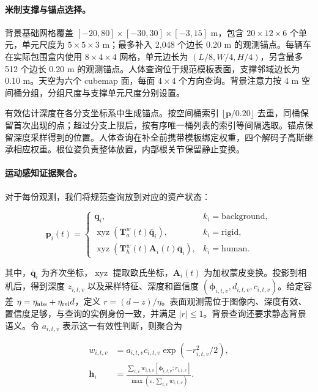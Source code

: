 \paragraph{米制支撑与锚点选择。}
背景基础网格覆盖 $[-20,80]\times[-30,30]\times[-3,15]$ m，包含 $20\times12\times6$ 个单元，单元尺度为 $5\times5\times3$ m；最多补入 2,048 个边长 0.20 m 的观测锚点。每辆车在实际包围盒内使用 $8\times4\times4$ 网格，单元边长为 $(L/8,W/4,H/4)$，另含最多 512 个边长 0.20 m 的观测锚点。人体查询位于规范模板表面，支撑邻域边长为 0.10 m。天空为六个 cubemap 面，每面 $4\times4$ 个方向查询。背景注意力按 4 m 空间桶分组，分组尺度与支撑单元尺度分别设置。

有效估计深度在各分支坐标系中生成锚点。按空间桶索引 $\lfloor\mathbf p/0.20\rfloor$ 去重，同桶保留首次出现的点；超过分支上限后，按有序唯一桶列表的索引等间隔选取。锚点保留深度采样得到的位置。人体查询在补全前携带模板绑定权重，四个解码子高斯继承相应权重。根位姿负责整体放置，内部根关节保留静止变换。

\paragraph{运动感知证据聚合。}

对于每份观测，我们将规范查询放到对应的资产状态：

\begin{equation}
\mathbf p_i(t)=
\begin{cases}
\mathbf q_i,& k_i=\mathrm{background},\\
\operatorname{xyz}(\mathbf T^w_a(t)\bar{\mathbf q}_i),& k_i=\mathrm{rigid},\\
\operatorname{xyz}(\mathbf T^w_h(t)\mathbf A_i(t)\bar{\mathbf q}_i),& k_i=\mathrm{human}.
\end{cases}
\label{eq:query-placement}
\end{equation}

其中，$\bar{\mathbf q}_i$ 为齐次坐标，$\operatorname{xyz}$ 提取欧氏坐标，$\mathbf A_i(t)$ 为加权蒙皮变换。投影到相机后，得到深度 $z_{i,t,v}$ 以及采样特征、深度和置信度 $(\boldsymbol\phi_{i,t,v},d_{i,t,v},c_{i,t,v})$。给定容差 $\eta=\eta_{\rm abs}+\eta_{\rm rel}d$，定义 $r=(d-z)/\eta$。表面观测需位于图像内、深度有效、置信度足够，与查询的实例身份一致，并满足 $|r|\leq1$。背景查询还要求静态背景语义。令 $a_{i,t,v}$ 表示这一有效性判断，则聚合为

\begin{align}
w_{i,t,v}&=a_{i,t,v}c_{i,t,v}\exp(-r_{i,t,v}^2/2),\\
\mathbf h_i&=\frac{\sum_{t,v}w_{i,t,v}[\boldsymbol\phi_{i,t,v};r_{i,t,v}]}
{\max(\varepsilon,\sum_{t,v}w_{i,t,v})}.
\label{eq:aggregation}
\end{align}


